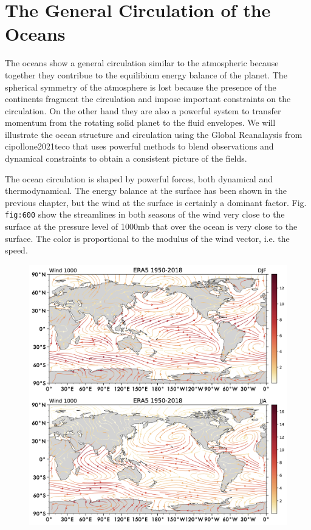\section{The General Circulation of the
Oceans}\label{the-general-circulation-of-the-oceans}

The oceans show a general circulation similar to the atmospheric because
together they contribue to the equilibium energy balance of the planet.
The spherical symmetry of the atmosphere is lost because the presence of
the continents fragment the circulation and impose important constraints
on the circulation. On the other hand they are also a powerful system to
transfer momentum from the rotating solid planet to the fluid envelopes.
We will illustrate the ocean structure and circulation using the Global
Reanalaysis from cipollone2021teco that uses powerful methods to blend
observations and dynamical constraints to obtain a consistent picture of
the fields.

The ocean circulation is shaped by powerful forces, both dynamical and
thermodynamical. The energy balance at the surface has been shown in the
previous chapter, but the wind at the surface is certainly a dominant
factor. Fig. \texttt{fig:600} show the streamlines in both seasons of
the wind very close to the surface at the pressure level of 1000mb that
over the ocean is very close to the surface. The color is proportional
to the modulus of the wind vector, i.e. the speed.

\begin{figure}
\centering
\includegraphics[width = .7 \textwidth]{figs/GD/Wind1000.png}
\caption{} \label{fig:}
\end{figure}

